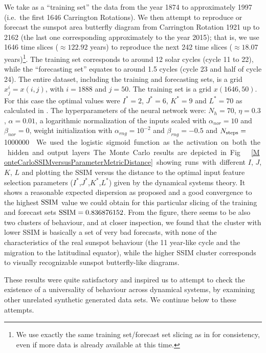 \documentclass[journal]{IEEEtran}
\begin{document}
We take as a ``training set'' the data from the year 1874 to 
approximately 1997 (i.e.\ the first 1646 Carrington Rotations). We then attempt to reproduce or forecast the sunspot area butterfly 
diagram from Carrington Rotation 1921 up to 2162 (the last one corresponding approximately to the year 2015); that is, we use 1646 time 
slices ($\approx 122.92$ years) to reproduce the next 242 time slices ($\approx 18.07$ years)\footnote{We use exactly
the same training set/forecast set slicing as in \cite{covas2016,covaspeixinhojoao} for consistency, even if more data is already
available at this time.}. The training set 
corresponds to around 12 solar cycles (cycle 11 to 22), while the ``forecasting set'' equates to around 1.5 cycles 
(cycle 23 and half of cycle 24). The entire dataset, including the training and forecasting sets, is a grid $x^i_j=x(i,j)$, with 
$i=1888$ and $j=50$. The training set is a grid $x(1646,50)$. For this case the optimal values were $I^*=2$, $J^*=6$, $K^*=9$ and 
$L^*=70$ as calculated in \cite{covas2016}. 
The hyperparameters of the neural network were:
$N_h=70$, $\eta=0.3$, $\alpha=0.01$, a logarithmic normalization of the inputs scaled
 with $\alpha_{nor} = 10$ and $\beta_{nor} = 0$, weight initialization with $\alpha_{rng} = 10^{-2}$ and $\beta_{rng} = -0.5$ 
 and $N_{\textnormal{steps}}=$\SI{1000000}\nobreak. We used the logistic sigmoid function as the activation on both the hidden and output layers.

The Monte Carlo results are depicted in Fig.\ \ref{MonteCarloSSIMversusParameterMetricDistance} showing runs with different $I$, $J$, $K$, $L$
and plotting the SSIM versus the distance to the optimal input feature selection parameters ($I^*$,$J^*$,$K^*$,$L^*$) 
given by the dynamical systems theory.  
It shows a reasonable expected dispersion as proposed and 
a good convergence to the highest $\textnormal{SSIM}$ value we could obtain for this particular slicing of the training and forecast sets 
$\textnormal{SSIM}= 0.836876152$. From the figure, there seems to be also two clusters of behaviour, and at closer inspection, we found that the
cluster with lower SSIM is basically a set of very bad forecasts, with none of the characteristics of the real sunspot behaviour (the 11 year-like cycle
and the migration to the latitudinal equator), while the higher SSIM cluster corresponds to visually recognizable sunspot butterfly-like diagrams.



These results were quite satisfactory and inspired us to attempt to check the existence of a universality of behaviour across
dynamical systems, by examining other unrelated synthetic
generated data sets. We continue below to these attempts.
\end{document}
